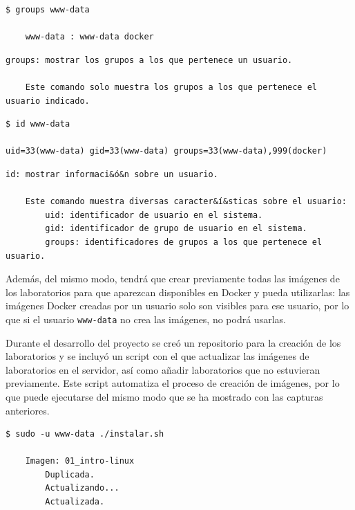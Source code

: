 \begin{appendices}
        \begin{lstlisting}[style=bash_style]
    $ groups www-data

    www-data : www-data docker
        \end{lstlisting}

        \begin{lstlisting}[style=comment_style]
    groups: mostrar los grupos a los que pertenece un usuario.

    Este comando solo muestra los grupos a los que pertenece el usuario indicado.
        \end{lstlisting}

        \begin{lstlisting}[style=bash_style]
    $ id www-data

uid=33(www-data) gid=33(www-data) groups=33(www-data),999(docker)
        \end{lstlisting}

        \begin{lstlisting}[style=comment_style]
    id: mostrar informaci&ó&n sobre un usuario.

    Este comando muestra diversas caracter&í&sticas sobre el usuario:
        uid: identificador de usuario en el sistema.
        gid: identificador de grupo de usuario en el sistema.
        groups: identificadores de grupos a los que pertenece el usuario.
        \end{lstlisting}

        Además, del mismo modo, tendrá que crear previamente todas las imágenes de los laboratorios para que aparezcan disponibles en Docker y pueda utilizarlas: las imágenes Docker creadas por un usuario solo son visibles para ese usuario, por lo que si el usuario \texttt{www-data} no crea las imágenes, no podrá usarlas.

        Durante el desarrollo del proyecto se creó un repositorio para la creación de los laboratorios y se incluyó un script con el que actualizar las imágenes de laboratorios en el servidor, así como añadir laboratorios que no estuvieran previamente. Este script automatiza el proceso de creación de imágenes, por lo que puede ejecutarse del mismo modo que se ha mostrado con las capturas anteriores.
        \\

        \begin{lstlisting}[style=bash_style]
    $ sudo -u www-data ./instalar.sh

    Imagen: 01_intro-linux
        Duplicada.
        Actualizando...
        Actualizada.


\end{lstlisting}
\end{appendices}
